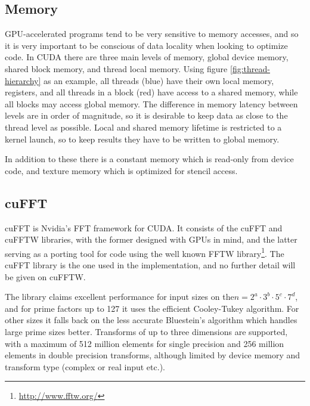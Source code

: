 \subsection{Memory}
GPU-accelerated programs tend to be very sensitive to memory accesses, and so it is very important to be conscious of
data locality when looking to optimize code. In CUDA there are three main levels of memory, global device memory, shared
block memory, and thread local memory. Using figure \ref{fig:thread-hierarchy} as an example, all threads (blue) have their
own local memory, registers, and all threads in a block (red) have access to a shared memory, while all blocks may access
global memory. The difference in memory latency between levels are in order of magnitude, so it is desirable to keep
data as close to the thread level as possible. Local and shared memory lifetime is restricted to a kernel launch, so to
keep results they have to be written to global memory.

In addition to these there is a constant memory which is read-only from device code, and texture memory which is
optimized for stencil access.

\subsection{cuFFT}
cuFFT is Nvidia's FFT framework for CUDA. It consists of the cuFFT and cuFFTW libraries, with the former designed with
GPUs in mind, and the latter serving as a porting tool for code using the well known FFTW library\footnote{\url{http://www.fftw.org/}}.
The cuFFT library is the one used in the implementation, and no further detail will be given on cuFFTW.

The library claims excellent performance for input sizes on the$n = 2^a \cdot 3^b \cdot 5^c \cdot 7^d$, and for prime
factors up to 127 it uses the efficient Cooley-Tukey algorithm. For other sizes it falls back on the less accurate Bluestein's
algorithm\cite[sec.~2.12]{cufft-doc} which handles large prime sizes better. Transforms of up to three dimensions are
supported, with a maximum of 512 million elements for single precision and 256 million elements in double precision
transforms, although limited by device memory and transform type (complex or real input etc.)\cite[sec.~1]{cufft-doc}.